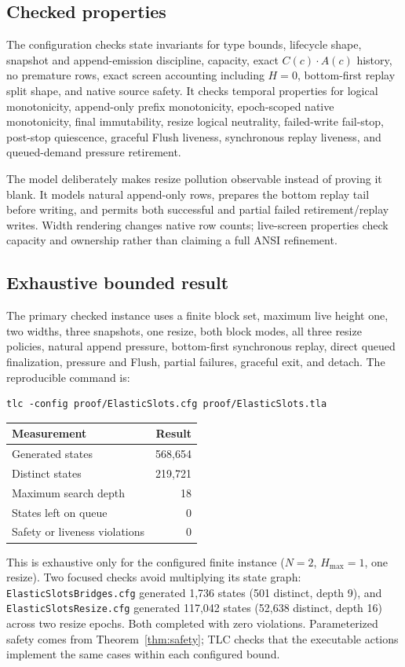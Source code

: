 \documentclass[11pt]{article}
\theoremstyle{definition}
\newcommand{\cat}{\mathbin{\cdot}}
\begin{document}
\subsection{Checked properties}

The configuration checks state invariants for type bounds, lifecycle shape,
snapshot and append-emission discipline, capacity, exact
$C(c)\cat A(c)$ history, no premature rows, exact screen accounting including
$H=0$, bottom-first replay split shape, and native source safety.  It checks
temporal properties for logical monotonicity, append-only prefix monotonicity,
epoch-scoped native monotonicity, final immutability, resize logical neutrality,
failed-write fail-stop, post-stop quiescence, graceful Flush liveness,
synchronous replay liveness, and queued-demand pressure retirement.

The model deliberately makes resize pollution observable instead of proving it
blank.  It models natural append-only rows, prepares the bottom replay tail
before writing, and permits both successful and partial failed
retirement/replay writes.  Width rendering changes native row counts; live-screen properties
check capacity and ownership rather than claiming a full ANSI refinement.

\subsection{Exhaustive bounded result}

The primary checked instance uses a finite block set, maximum live height one,
two widths, three snapshots, one resize, both block modes, all three resize
policies, natural append pressure, bottom-first synchronous replay, direct
queued finalization, pressure and Flush, partial failures, graceful exit, and
detach.  The reproducible command is:

\begin{verbatim}
tlc -config proof/ElasticSlots.cfg proof/ElasticSlots.tla
\end{verbatim}

\begin{center}
\begin{tabular}{@{}lr@{}}
\toprule
Measurement & Result\\
\midrule
Generated states & 568,654\\
Distinct states & 219,721\\
Maximum search depth & 18\\
States left on queue & 0\\
Safety or liveness violations & 0\\
\bottomrule
\end{tabular}
\end{center}

This is exhaustive only for the configured finite instance
($N=2$, $H_{\max}=1$, one resize).  Two focused checks avoid multiplying its
state graph: \texttt{ElasticSlotsBridges.cfg} generated 1,736 states
(501 distinct, depth 9), and \texttt{ElasticSlotsResize.cfg} generated
117,042 states (52,638 distinct, depth 16) across two resize epochs.  Both
completed with zero violations.  Parameterized safety comes from
Theorem~\ref{thm:safety}; TLC checks that the executable actions implement the
same cases within each configured bound.
\end{document}
